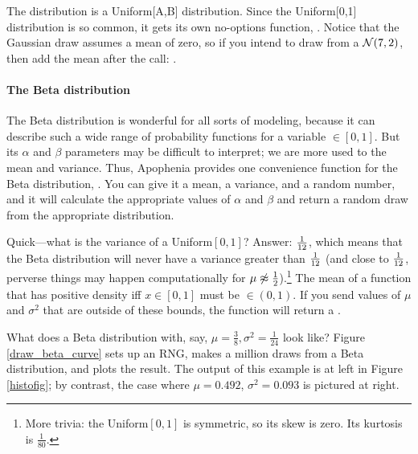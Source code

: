 The  distribution is a Uniform[A,B] distribution. Since the
Uniform[0,1] distribution is so common, it gets its own no-options
function, . Notice that the Gaussian draw
assumes a mean of zero, so if you intend to draw from a ${\cal N}(7,2)$,
then add the mean after the call: .

\paragraph{The Beta distribution}\label{beta}
The Beta distribution is wonderful for all sorts of modeling, because
it can describe such a wide range of probability functions for a
variable $\in [0,1]$.  But its $\alpha$ and $\beta$ parameters may be
difficult to interpret; we are more used to the mean and variance. Thus,
Apophenia provides one convenience function for the Beta distribution,
. You can give it a mean, a variance, and
a random number, and it will calculate the appropriate values of $\alpha$
and $\beta$ and return a random draw from the appropriate distribution.

Quick---what is the variance of a Uniform$[0,1]$? Answer: ${1\over 12}$,
which means that the Beta distribution will never have a variance greater
than ${1\over 12}$ (and close to ${1\over 12}$, perverse things may
happen computationally for $\mu \not\approx {1\over 2}$).\footnote{More
trivia: the Uniform$[0,1]$ is symmetric, so its skew is zero. Its
kurtosis is $\frac{1}{80}$.} The mean of a
function that has positive density iff $x \in [0,1]$ must be
$\in (0,1)$. If you send  values of $\mu$
and $\sigma^2$ that are outside of these bounds, the function will
return a .


What does a Beta distribution with, say, $\mu = \frac{3}{8}, \sigma^2 =
\frac{1}{24}$ look like? Figure \ref{draw_beta_curve} sets up an RNG,
makes a million draws from a Beta distribution, and plots the result.
The output of this example is at left in Figure \ref{histofig}; by
contrast, the case where $\mu=0.492$, $\sigma^2 = 0.093$ is pictured at
right.



\def\bebox#1{\vbox{\hbox{\rotatebox{-90}{\texttt{[image: \#1]}}} }}

